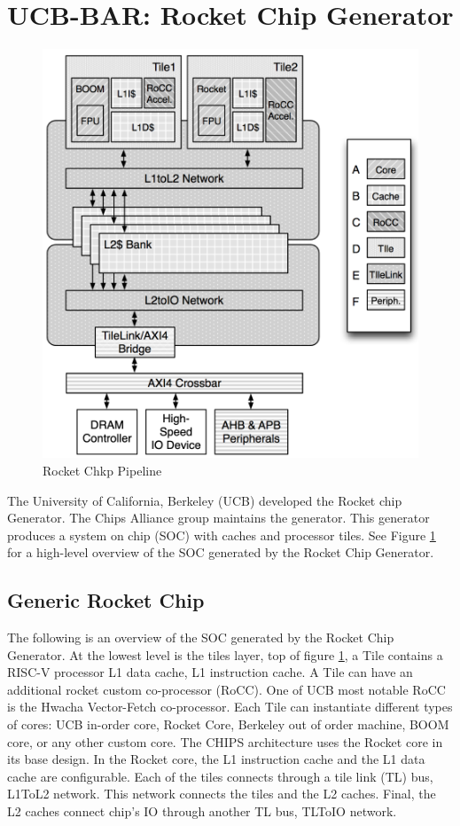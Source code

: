 \documentclass[../main.tex]{subfiles}
\begin{document}
\section{UCB-BAR: Rocket Chip Generator}
\begin{figure}
    \centering
    \includegraphics[scale=.5]{pngs/RocketChipGeneratorLayout.png}
    \caption{Rocket Chkp Pipeline\cite{Asanović:EECS-2016-17}}
    \label{fig:RocketCipGen}
\end{figure}
The University of California, Berkeley (UCB) developed the Rocket chip Generator. The Chips Alliance group maintains the generator. This generator produces a system on chip (SOC) with caches and processor tiles. See Figure \ref{fig:RocketCipGen}  for a high-level overview of the SOC generated by the Rocket Chip Generator\cite{Chips-Alliance}.

\subsection{Generic Rocket Chip}
The following is an overview of the SOC generated by the Rocket Chip Generator. At the lowest level is the tiles layer, top of figure \ref{fig:RocketCipGen}, a Tile contains a RISC-V processor L1 data cache, L1 instruction cache. A Tile can have an additional rocket custom co-processor (RoCC). One of UCB most notable RoCC is the Hwacha Vector-Fetch co-processor\cite{HwachaPaper}. Each Tile can instantiate different types of cores: UCB in-order core, Rocket Core, Berkeley out of order machine, BOOM core, or any other custom core. The CHIPS architecture uses the Rocket core in its base design. In the Rocket core, the L1 instruction cache and the L1 data cache are configurable. Each of the tiles connects through a tile link (TL) bus, L1ToL2 network. This network connects the tiles and the L2 caches. Final, the L2 caches connect chip's IO through another TL bus, TLToIO network.
\end{document}
